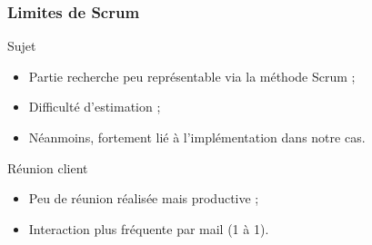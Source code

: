 \begin{frame}
\frametitle{Limites de Scrum}

\begin{block}{Sujet}
\begin{itemize}
\item Partie recherche peu représentable via la méthode Scrum ;
\item Difficulté d'estimation ;
\item Néanmoins, fortement lié à l'implémentation dans notre cas.
\end{itemize}
\end{block}

\begin{block}{Réunion client}
\begin{itemize}
\item Peu de réunion réalisée mais productive ;
\item Interaction plus fréquente par mail (1 à 1).
\end{itemize}
\end{block}

\end{frame}
